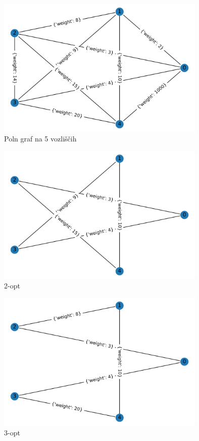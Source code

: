 \documentclass[8pt]{beamer}
\begin{document}
\begin{frame}
  \begin{figure}
  \includegraphics[width=10cm]{primeri/primer1.png}
 	\caption{Poln graf na 5 vozliščih}
	\label{Slika 1}
	\end{figure}
\end{frame}

\begin{frame}
\begin{figure}
  \includegraphics[width=10cm]{primeri/primer1_2opt.png}
\caption{2-opt}
\label{Slika 2}
\end{figure}
\end{frame}

\begin{frame}
  \begin{figure}
  \includegraphics[width=10cm]{primeri/primer1_3opt.png}
 	\caption{3-opt}
	\label{Slika 3}
	\end{figure}
\end{frame}
\end{document}
